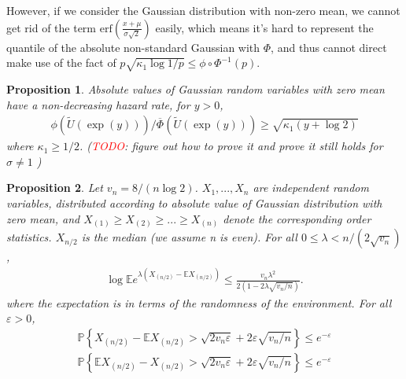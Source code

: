 \documentclass{article}
\theoremstyle{plain}
\newtheorem{prop}{Proposition}
\begin{document}
However, if we consider the Gaussian distribution with non-zero mean, we cannot get rid of the term $\text{erf}(\frac{x + \mu}{\sigma \sqrt{2}})$ easily, which means it's hard to represent the quantile of the absolute non-standard Gaussian with $\Phi$, and thus cannot direct make use of the fact of $p \sqrt{\kappa_{1} \log 1 / p} \leq \phi \circ \Phi^{-1}(p)$.



\begin{prop}
\label{prop: hazard bound for normal}
Absolute values of Gaussian random variables with zero mean have a non-decreasing
hazard rate, for $y>0$,
\begin{align}
    \phi(\tilde{U}(\exp (y))) / \overline{\Phi}(\tilde{U}(\exp (y))) \geq \sqrt{\kappa_{1}(y+\log 2)}
\end{align}
 where $\kappa_{1} \geq 1 / 2$. (\textcolor{red}{TODO}: figure out how to prove it and prove it still holds for $\sigma \neq 1$ )

\end{prop}

\begin{prop}
\label{prop 4.6}
Let $v_{n}=8 /(n \log 2)$. $X_1, ..., X_n$ are independent random variables, distributed according to absolute value of Gaussian distribution with zero mean, and $X_{(1)} \geq X_{(2)} \geq ... \geq X_{(n)}$ denote the corresponding order statistics. $X_{n/2}$ is the median (we assume n is even). For all $0 \leq \lambda<n /\left(2 \sqrt{v_{n}}\right)$, 
\begin{align}
    \log \mathbb{E}e^{\lambda\left(X_{(n / 2)}-\mathbb{E} X_{(n / 2)}\right)} \leq \frac{v_{n} \lambda^{2}}{2\left(1-2 \lambda \sqrt{v_{n} / n}\right)}.
\end{align}
where the expectation is in terms of the randomness of the environment. For all $\varepsilon > 0$,
\begin{align} 
    \label{inequality Bernstein upper bound for normal}
    \mathbb{P}\left\{X_{(n / 2)}-\mathbb{E} X_{(n / 2)}>\sqrt{2 v_{n} \varepsilon}+2 \varepsilon \sqrt{v_{n} / n}\right\} \leq e^{-\varepsilon}\\
    \label{inequality Bernstein lower bound for normal}
    \mathbb{P}\left\{\mathbb{E} X_{(n / 2)} - X_{(n / 2)}>\sqrt{2 v_{n} \varepsilon}+2 \varepsilon \sqrt{v_{n} / n}\right\} \leq e^{-\varepsilon}
\end{align}
\end{prop}
\end{document}
